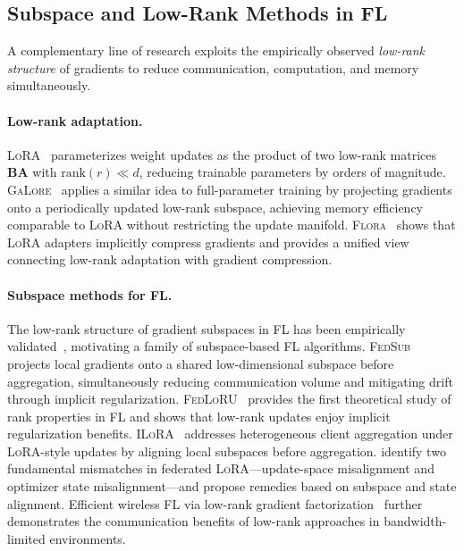 \subsection{Subspace and Low-Rank Methods in FL}
\label{subsec:subspace}

A complementary line of research exploits the empirically observed
\emph{low-rank structure} of gradients to reduce communication,
computation, and memory simultaneously.

\paragraph{Low-rank adaptation.}
\textsc{LoRA}~\citep{hu2022lora} parameterizes weight updates as the
product of two low-rank matrices $\mathbf{B}\mathbf{A}$ with
$\text{rank}(r) \ll d$, reducing trainable parameters by orders of
magnitude.
\textsc{GaLore}~\citep{zhao2024galore} applies a similar idea to
full-parameter training by projecting gradients onto a periodically
updated low-rank subspace, achieving memory efficiency comparable to
\textsc{LoRA} without restricting the update manifold.
\textsc{Flora}~\citep{hao2024flora} shows that \textsc{LoRA} adapters
implicitly compress gradients and provides a unified view connecting
low-rank adaptation with gradient compression.

\paragraph{Subspace methods for FL.}
The low-rank structure of gradient subspaces in FL has been
empirically validated~\citep{azam2022recycling}, motivating a family of
subspace-based FL algorithms.
\textsc{FedSub}~\citep{zhang2025fedsub} projects local gradients onto a
shared low-dimensional subspace before aggregation, simultaneously
reducing communication volume and mitigating drift through implicit
regularization.
\textsc{FedLoRU}~\citep{park2024fedloru} provides the first theoretical
study of rank properties in FL and shows that low-rank updates enjoy
implicit regularization benefits.
\textsc{ILoRA}~\citep{zhou2025ilora} addresses heterogeneous client
aggregation under \textsc{LoRA}-style updates by aligning local
subspaces before aggregation.
\citet{peng2026rethinking} identify two fundamental mismatches in
federated \textsc{LoRA}—update-space misalignment and optimizer state
misalignment—and propose remedies based on subspace and state
alignment.
Efficient wireless FL via low-rank gradient
factorization~\citep{guo2024efficient} further demonstrates the
communication benefits of low-rank approaches in bandwidth-limited
environments.

